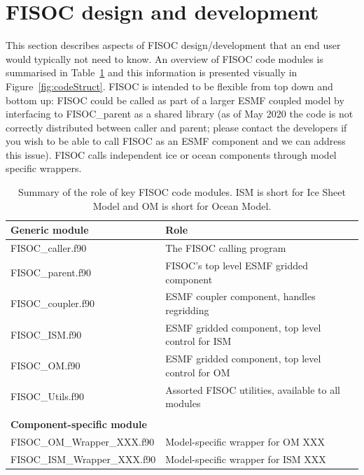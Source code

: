 \documentclass[11pt]{article}
\begin{document}
\section{FISOC design and development}
\label{sec:FISOC_SDG}

This section describes aspects of FISOC design/development that an end user
would typically not need to know.
An overview of FISOC code modules is summarised
in Table~\ref{tab:modules} and this information is presented visually 
in Figure~\ref{fig:codeStruct}.
FISOC is intended to be flexible from top down and bottom up:
FISOC could be called as part of a larger ESMF coupled model by interfacing to FISOC\_parent
as a shared library (as of May 2020 the code is not correctly distributed between caller and parent;
please contact the developers if you wish to be able to call FISOC as an ESMF component and we
can address this issue).
FISOC calls independent ice or ocean components through model specific wrappers. 

\begin{table}
  \begin{center}
    \begin{tabular}{ l|l }
      \textbf{Generic module} &  \textbf{Role}                              \\
      \hline
      FISOC\_caller.f90     &  The FISOC calling program \\
      FISOC\_parent.f90     &  FISOC's top level ESMF gridded component \\
      FISOC\_coupler.f90    &  ESMF coupler component, handles regridding \\
      FISOC\_ISM.f90        &  ESMF gridded component, top level control for ISM \\
      FISOC\_OM.f90         &  ESMF gridded component, top level control for OM  \\
      FISOC\_Utils.f90      &  Assorted FISOC utilities, available to all modules \\
      \\ 
      \textbf{Component-specific module} &                       \\
      \hline
      FISOC\_OM\_Wrapper\_XXX.f90  & Model-specific wrapper for OM XXX \\
      FISOC\_ISM\_Wrapper\_XXX.f90 & Model-specific wrapper for ISM XXX \\
    \end{tabular}
  \end{center}
  \caption{
    Summary of the role of key FISOC code modules.
    ISM is short for Ice Sheet Model and OM is short for Ocean Model.
  }
  \label{tab:modules}
\end{table}
\end{document}
